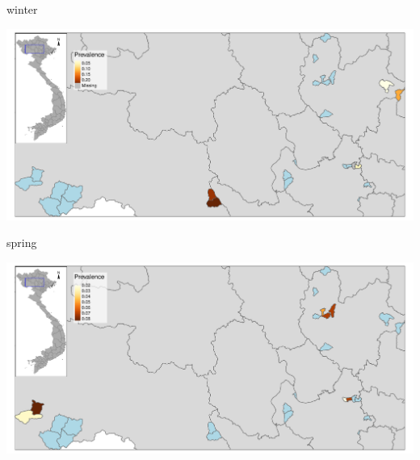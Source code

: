 \begin{frame}
winter\\
\begin{center}
\includegraphics[width=1\textwidth]{map06_winter.pdf}
\end{center}
\end{frame}


\begin{frame}
spring\\
\begin{center}
\includegraphics[width=1\textwidth]{map06_spring.pdf}
\end{center}
\end{frame}

